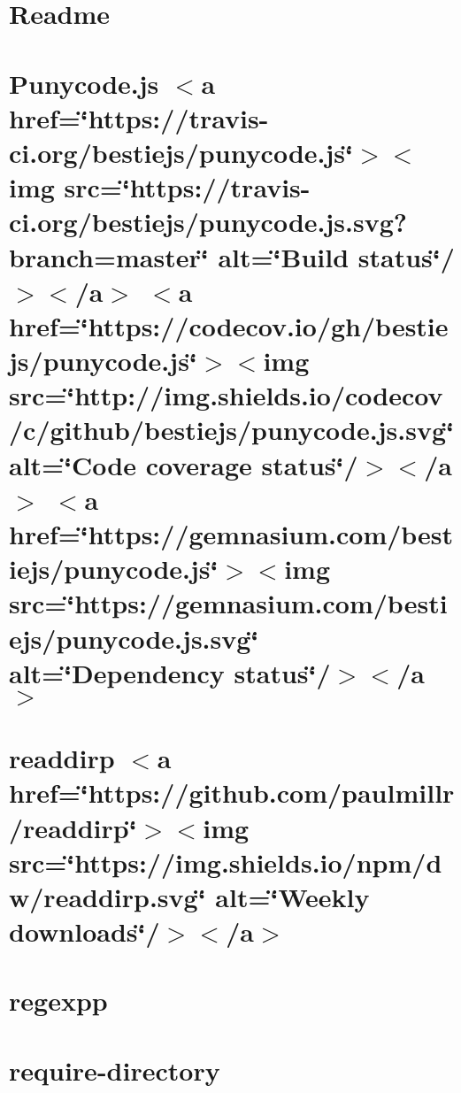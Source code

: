 \let\mypdfximage\pdfximage\def\pdfximage{\immediate\mypdfximage}\documentclass[twoside]{book}
\newcommand{\+}{\discretionary{\mbox{\scriptsize$\hookleftarrow$}}{}{}}
\begin{document}
\chapter{Readme}
\label{md_heap-visualizer_node_modules_progress__readme}

\chapter{Punycode.\+js $<$a href=\char`\"{}https\+://travis-\/ci.\+org/bestiejs/punycode.\+js\char`\"{}$>$$<$img src=\char`\"{}https\+://travis-\/ci.\+org/bestiejs/punycode.\+js.\+svg?branch=master\char`\"{} alt=\char`\"{}\+Build status\char`\"{}/$>$$<$/a$>$ $<$a href=\char`\"{}https\+://codecov.\+io/gh/bestiejs/punycode.\+js\char`\"{}$>$$<$img src=\char`\"{}http\+://img.\+shields.\+io/codecov/c/github/bestiejs/punycode.\+js.\+svg\char`\"{} alt=\char`\"{}\+Code coverage status\char`\"{}/$>$$<$/a$>$ $<$a href=\char`\"{}https\+://gemnasium.\+com/bestiejs/punycode.\+js\char`\"{}$>$$<$img src=\char`\"{}https\+://gemnasium.\+com/bestiejs/punycode.\+js.\+svg\char`\"{} alt=\char`\"{}\+Dependency status\char`\"{}/$>$$<$/a$>$}
\label{md_heap-visualizer_node_modules_punycode__r_e_a_d_m_e}

\chapter{readdirp $<$a href=\char`\"{}https\+://github.\+com/paulmillr/readdirp\char`\"{}$>$$<$img src=\char`\"{}https\+://img.\+shields.\+io/npm/dw/readdirp.\+svg\char`\"{} alt=\char`\"{}\+Weekly downloads\char`\"{}/$>$$<$/a$>$}
\label{md_heap-visualizer_node_modules_readdirp__r_e_a_d_m_e}

\chapter{regexpp}
\label{md_heap-visualizer_node_modules_regexpp__r_e_a_d_m_e}

\chapter{require-\/directory}
\label{md_heap-visualizer_node_modules_require-directory__r_e_a_d_m_e}

\end{document}
